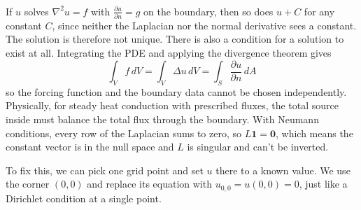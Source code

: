 \documentclass[12pt,answers]{exam}
\begin{document}
\begin{enumerate}
\begin{solution}
\begin{align*}
\end{align*}
If $u$ solves $\nabla^2 u = f$ with $\frac{\partial u}{\partial n} = g$ on the boundary, then so does $u + C$ for any constant $C$, since neither the Laplacian nor the normal derivative sees a constant. The solution is therefore not unique. There is also a condition for a solution to exist at all. Integrating the PDE and applying the divergence theorem gives 
\[\int_{V} f \, dV = \int_{V} \Delta u \, dV = \int_{S} \frac{\partial u}{\partial n} \, dA\]
so the forcing function and the boundary data cannot be chosen independently. Physically, for steady heat conduction with prescribed fluxes, the total source inside must balance the total flux through the boundary. With Neumann conditions, every row of the Laplacian sums to zero, so $L\mathbf{1} = \mathbf{0}$, which means the constant vector is in the null space and $L$ is singular and can't be inverted.

To fix this, we can pick one grid point and set $u$ there to a known value. We use the corner $(0,0)$ and replace its equation with $u_{0,0} = u(0,0) = 0$, just like a Dirichlet condition at a single point. 

    \end{solution}
\end{enumerate}
\end{document}
